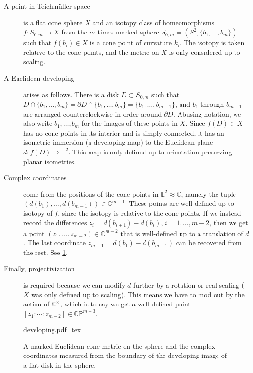 \documentclass{amsart}
\begin{document}
    \begin{description}
        \item[A point in Teichm\"uller space] is a flat cone sphere $X$ and an isotopy class of homeomorphisms $f:S_{0,m} \to X$ from the $m$-times marked sphere $S_{0,m} = (S^2,\{b_1,\dotsc,b_m\})$ such that $f(b_i) \in X$ is a cone point of curvature $k_i$. The isotopy is taken relative to the cone points, and the metric on $X$ is only considered up to scaling.
        
        \item[A Euclidean developing] arises as follows. There is a disk $D \subset S_{0,m}$ such that $D \cap \{b_1,\dotsc,b_m\} = \partial D \cap \{b_1,\dotsc,b_m\} = \{b_1,\dotsc,b_{m-1}\}$, and $b_1$ through $b_{m-1}$ are arranged counterclockwise in order around $\partial D$. Abusing notation, we also write $b_1,\dotsc,b_m$ for the images of these points in $X$. Since $f(D) \subset X$ has no cone points in its interior and is simply connected, it has an isometric immersion (a developing map) to the Euclidean plane $d:f(D) \to \mathbb{E}^2$. This map is only defined up to orientation preserving planar isometries.
        
        \item[Complex coordinates] come from the positions of the cone points in $\mathbb{E}^2 \approx \mathbb{C}$, namely the tuple $(d(b_1),\dotsc,d(b_{m-1})) \in \mathbb{C}^{m-1}$. These points are well-defined up to isotopy of $f$, since the isotopy is relative to the cone points. If we instead record the differences $z_i=d(b_{i+1})-d(b_i)$, $i=1,\dotsc,m-2$, then we get a point $(z_1,\dotsc,z_{m-2}) \in \mathbb{C}^{m-2}$ that is well-defined up to a translation of $d$. The last coordinate $z_{m-1}=d(b_1)-d(b_{m-1})$ can be recovered from the rest. See \cref{fig:developing_cone_sphere}.
        
        \item[Finally, projectivization] is required because we can modify $d$ further by a rotation or real scaling ($X$ was only defined up to scaling). This means we have to mod out by the action of $\mathbb{C}^\times$, which is to say we get a well-defined point $[z_1:\dotsb:z_{m-2}] \in \mathbb{CP}^{m-3}$.
    \end{description}
    
    \begin{figure}
            \centering
            \def\svgwidth{\columnwidth}
            {developing.pdf_tex}
            \caption{A marked Euclidean cone metric on the sphere and the complex coordinates measured from the boundary of the developing image of a flat disk in the sphere.}
            \label{fig:developing_cone_sphere}
    \end{figure}
    
\end{document}
